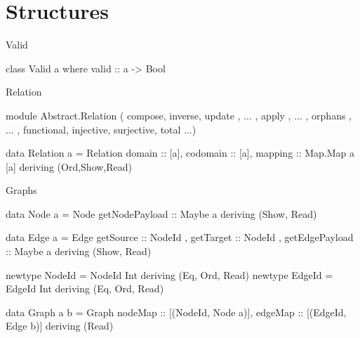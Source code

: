 \documentclass[xcolor=dvipsnames,pdf,11pt,handout]{beamer}
\begin{document}

\section{Structures}

\begin{frame}[fragile]{Valid}{}

\color{blue}
\begin{haskell}
class Valid a where
    valid :: a -> Bool
\end{haskell}
\color{black}

\end{frame}

\begin{frame}[fragile]{Relation}{}

\color{blue}
\begin{haskell}
module Abstract.Relation (
      compose, inverse, update
    , ...
    , apply
    , ...
    , orphans
    , ...
    , functional, injective, surjective, total ...)

data Relation a = Relation {
       domain   :: [a],
       codomain :: [a],
       mapping  :: Map.Map a [a]
   } deriving (Ord,Show,Read)
\end{haskell}
\color{black}

\end{frame}

\begin{frame}[fragile]{Graphs}{}

\small
\color{blue}
\begin{haskell}
data Node a = Node { getNodePayload :: Maybe a
              } deriving (Show, Read)
\end{haskell}

\begin{haskell}
data Edge a = Edge { getSource      :: NodeId
                   , getTarget      :: NodeId
                   , getEdgePayload :: Maybe a
              } deriving (Show, Read)
\end{haskell}

\begin{haskell}
newtype NodeId = NodeId Int deriving (Eq, Ord, Read)
newtype EdgeId = EdgeId Int deriving (Eq, Ord, Read)
\end{haskell}

\begin{haskell}
data Graph a b = Graph {
    nodeMap :: [(NodeId, Node a)],
    edgeMap :: [(EdgeId, Edge b)]
    } deriving (Read)
\end{haskell}
\color{black}

\end{frame}
\end{document}
